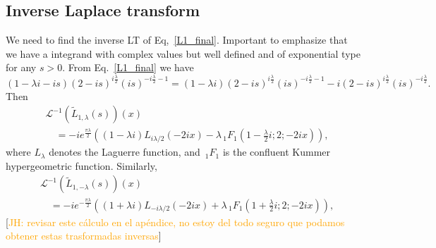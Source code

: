 \documentclass[%
 aip,
 jmp,%
 amsmath,amssymb,
 reprint,%
]{revtex4-2}
\begin{document}
\subsection{Inverse Laplace transform}

We need to find the inverse LT of Eq,~\eqref{L1_final}. Important to emphasize that we have a integrand with complex values but well defined and of exponential type for any $s > 0$.
From Eq.~\eqref{L1_final} we have
\begin{equation}\label{eq:L1_final-2}
    (1-\lambda i-i s) (2-i s)^{i\frac{\lambda}{2} } (i s)^{-i\frac{\lambda}{2}-1} = (1-\lambda i) (2-i s)^{i\frac{\lambda}{2} } (i s)^{-i\frac{\lambda}{2}-1} -i  (2-i s)^{i\frac{\lambda}{2} } (i s)^{-i\frac{\lambda}{2}}.
\end{equation}
Then
\[
\boxed{\begin{aligned}
& \mathcal L^{-1}\left(\widetilde L_{1,\lambda} (s) \right)(x)\\
& \quad =  -i e^{\frac{\pi  \lambda}{2}}  \left( (1-\lambda i)  L_{i \lambda/2}(-2 i x)  - \lambda \, _1F_1\left(1- \frac{\lambda}2 i ;2;-2 i x \right) \right),
\end{aligned}}
\]
where $L_\lambda$ denotes the Laguerre function, and $\,_1F_1$ is the confluent Kummer hypergeometric function. Similarly, 
\[
\boxed{\begin{aligned}
& \mathcal L^{-1}\left(\widetilde L_{1,-\lambda} (s) \right)(x)\\
& \quad = -i  e^{-\frac{\pi  \lambda}{2}}   \left( (1+ \lambda i)L_{-i \lambda/2}(-2 i x) + \lambda \, _1F_1\left(1+  \frac{\lambda}2i ;2;-2 i x \right) \right),
\end{aligned}}
\]
[\textcolor{orange}{JH: revisar este cálculo en el apéndice, no estoy del todo seguro que podamos obtener estas trasformadas inversas}]
\end{document}
